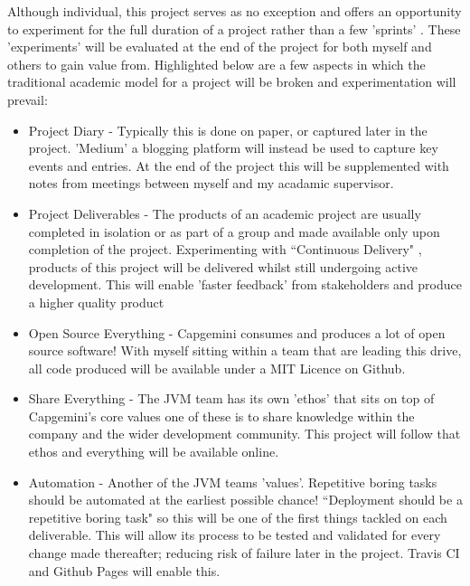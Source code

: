 Although individual, this project serves as no exception and offers an
opportunity to experiment for the full duration of a project rather than a
few 'sprints' \citep{ScrumSprint}. These 'experiments' will be evaluated at the
end of the project for both myself and others to gain value from. Highlighted
below are a few aspects in which the traditional academic model for a
project will be broken and experimentation will prevail:
 \begin{itemize}
  \item Project Diary - Typically this is done on paper, or captured later in
   the project. 'Medium' \citep{Medium} a blogging platform will instead be
   used to
   capture key events and entries. At the end of the project this will be
   supplemented with notes from meetings between myself and my acadamic
   supervisor.
  \item Project Deliverables - The products of an academic project are usually
  completed in isolation or as part of a group and made available only upon
  completion of the project. Experimenting with ``Continuous Delivery"
  \citep{ContinuousDelivery}, products of this project will be delivered
  whilst still undergoing active development. This will enable 'faster
  feedback' from stakeholders and produce a higher quality product
  \item Open Source Everything - Capgemini consumes and
  produces a lot of open source software! With myself sitting within a team
  that are leading this drive, all code produced will be available under a MIT
  Licence \citep{MITLicence} on Github.
  \item Share Everything - The JVM team has its own 'ethos'
  \citep{JVMHowWeWork} that sits on top
  of Capgemini's core values one of these is to share knowledge within the
  company and the wider development community. This project will follow that
  ethos and everything will be available online.
  \item Automation - Another of the JVM teams 'values'. Repetitive boring tasks
  should be automated at the earliest possible chance! ``Deployment should be a
   repetitive boring task" \citep{ZachHolman} so this will be one of the first
   things
   tackled on
   each deliverable. This will allow its process to be tested and validated
   for every change made thereafter; reducing risk of failure later in the
   project. Travis CI \citep{TravisCi} and Github Pages \citep{Ghpages} will
   enable
   this.
 \end{itemize}


